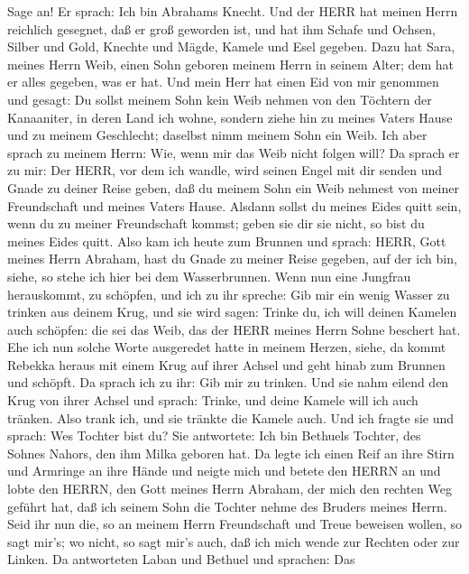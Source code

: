 Sage an!  Er sprach: Ich bin Abrahams Knecht. 
Und der HERR hat meinen Herrn reichlich gesegnet, daß er groß geworden
ist, und hat ihm Schafe und Ochsen, Silber und Gold, Knechte und Mägde,
Kamele und Esel gegeben.  Dazu hat Sara, meines Herrn Weib,
einen Sohn geboren meinem Herrn in seinem Alter; dem hat er alles
gegeben, was er hat.  Und mein Herr hat einen Eid von mir
genommen und gesagt: Du sollst meinem Sohn kein Weib nehmen von den
Töchtern der Kanaaniter, in deren Land ich wohne,  sondern
ziehe hin zu meines Vaters Hause und zu meinem Geschlecht; daselbst nimm
meinem Sohn ein Weib.  Ich aber sprach zu meinem Herrn:
Wie, wenn mir das Weib nicht folgen will?  Da sprach er zu
mir: Der HERR, vor dem ich wandle, wird seinen Engel mit dir senden und
Gnade zu deiner Reise geben, daß du meinem Sohn ein Weib nehmest von
meiner Freundschaft und meines Vaters Hause.  Alsdann
sollst du meines Eides quitt sein, wenn du zu meiner Freundschaft
kommst; geben sie dir sie nicht, so bist du meines Eides quitt.
 Also kam ich heute zum Brunnen und sprach: HERR, Gott
meines Herrn Abraham, hast du Gnade zu meiner Reise gegeben, auf der ich
bin,  siehe, so stehe ich hier bei dem Wasserbrunnen. Wenn
nun eine Jungfrau herauskommt, zu schöpfen, und ich zu ihr spreche: Gib
mir ein wenig Wasser zu trinken aus deinem Krug,  und sie
wird sagen: Trinke du, ich will deinen Kamelen auch schöpfen: die sei
das Weib, das der HERR meines Herrn Sohne beschert hat. 
Ehe ich nun solche Worte ausgeredet hatte in meinem Herzen, siehe, da
kommt Rebekka heraus mit einem Krug auf ihrer Achsel und geht hinab zum
Brunnen und schöpft. Da sprach ich zu ihr: Gib mir zu trinken.
 Und sie nahm eilend den Krug von ihrer Achsel und sprach:
Trinke, und deine Kamele will ich auch tränken. Also trank ich, und sie
tränkte die Kamele auch.  Und ich fragte sie und sprach:
Wes Tochter bist du? Sie antwortete: Ich bin Bethuels Tochter, des
Sohnes Nahors, den ihm Milka geboren hat. Da legte ich einen Reif an
ihre Stirn und Armringe an ihre Hände  und neigte mich und
betete den HERRN an und lobte den HERRN, den Gott meines Herrn Abraham,
der mich den rechten Weg geführt hat, daß ich seinem Sohn die Tochter
nehme des Bruders meines Herrn.  Seid ihr nun die, so an
meinem Herrn Freundschaft und Treue beweisen wollen, so sagt mir's; wo
nicht, so sagt mir's auch, daß ich mich wende zur Rechten oder zur
Linken.  Da antworteten Laban und Bethuel und sprachen: Das
